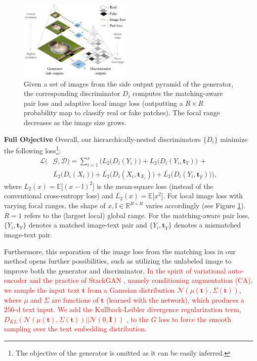 \documentclass[10pt,twocolumn,letterpaper]{article}
\begin{document}
\begin{figure}[t]
	\centering
	\includegraphics[width=0.49\textwidth]{figure/loss.pdf}
	\vspace{-.7cm}
	\caption{Given a set of images from the side output pyramid of the generator, the corresponding discriminator $D_i$ computes the matching-aware pair loss and adaptive local image loss (outputting a $R{\times}R$ probability map to classify real or fake patches). The focal range decreases as the image size grows. }  \vspace{-.3cm}
	\label{fig:loss}
\end{figure}


\textbf{Full Objective } Overall, our hierarchically-nested discriminators $\{D_i\}$ minimize the following loss\footnote{The objective of the generator is omitted as it can be easily inferred.}:
\vspace{-.2cm}
\begin{equation}
\begin{split}
\mathcal{L}(& \mathcal{G}, \mathcal{D})  = \sum_{i=1}^{s} \Big(  L_2\big(D_i({Y}_i)\big) +  L_2\big(D_i({Y}_i, \bm t_{Y})\big) \, + \\ 
& \overline{L_2}\big(D_i({X}_i)\big)  + \overline{L_2}\big(D_i({X}_i, \bm{t}_{X_i})\big) + \overline{L_2}\big(D_i({Y}_i,  \bm{t}_{\overline{Y}})\big) \Big),
\end{split}
\end{equation}
where $L_2(x) = \mathbb{E}\big[(x - \mathbb{I})^2\big]$ is the mean-square loss (instead of the conventional cross-entropy loss) and $\overline{L_2}(x) =\mathbb{E}\big[x^2\big]$. For local image loss with varying focal ranges, the shape of $x, \mathbb{I} \in \mathbb{R}^{R{\times}R}$ varies accordingly (see Figure \ref{fig:loss}). $R=1$ refers to the (largest local) global range. For the matching-aware pair loss, 
$\{Y_i, \bm t_{Y}\}$ denotes a matched image-text pair and $\{Y_i, \bm{t}_{\overline{Y}}\}$ denotes a mismatched image-text pair.

Furthermore, this separation of the image loss from the matching loss in our method opens further possibilities, such as utilizing the unlabeled image to improve both the generator and discriminator.
\textcolor{red}{In the spirit of variational auto-encoder \cite{vae} and the practice of StackGAN \cite{han2017stackgan}, namely conditioning augmentation (CA), we sample the input text $\bm t$ from a Ganssian distribution $\mathcal{N}(\mu({\bm t}), \Sigma({\bm t}))$, where $\mu$ and $\Sigma$ are functions of $\bm t$ (learned with the network), which produces a $256$-d text input.
We add the Kullback-Leibler divergence regularization term, $D_{KL}(\mathcal{N}(\mu({\bm t}), \Sigma({\bm t}) )|| \mathcal{N}(0, \bm{I}))$ \cite{vae}, to the $G$ loss to force the smooth sampling over the text embedding distribution. }
\end{document}
